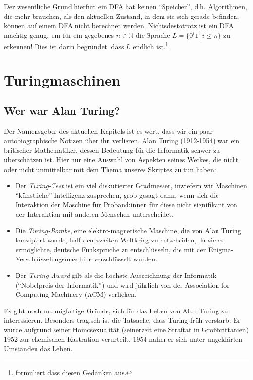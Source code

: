 Der wesentliche Grund hierfür: ein DFA hat keinen ``Speicher'',
d.h. Algorithmen, die mehr brauchen, als den aktuellen Zustand,
in dem sie sich gerade befinden,
können auf einem DFA nicht berechnet werden.
Nichtsdestotrotz ist ein DFA mächtig genug,
um für ein gegebenes $n \in \mathbb{N}$ die Sprache
$L = \{0^i1^i| i \leq n\}$ zu erkennen!
Dies ist darin begründet,
dass $L$ endlich ist.\footnote{
    \cite{aul} formuliert dass diesen Gedanken aus.
}

\section{Turingmaschinen}
\subsection{Wer war Alan Turing?}
Der Namensgeber des aktuellen Kapitels ist es wert,
dass wir ein paar autobiographische Notizen über ihn verlieren.
Alan Turing (1912-1954) war ein britischer Mathematiker,
dessen Bedeutung für die Informatik schwer zu überschätzen ist.
Hier nur eine Auswahl von Aspekten seines Werkes,
die nicht oder nicht unmittelbar mit dem Thema unseres Skriptes zu tun haben:
\begin{itemize}
    \item Der \emph{Turing-Test} ist ein viel diskutierter Gradmesser,
        inwiefern wir Maschinen ``künstliche'' Intelligenz zusprechen,
        grob gesagt dann, wenn sich die Interaktion der Maschine für Proband:innen
        für diese nicht signifikant von der Interaktion mit anderen Menschen unterscheidet.
    \item Die \emph{Turing-Bombe}, eine elektro-magnetische Maschine,
        die von Alan Turing konzipiert wurde,
        half den zweiten Weltkrieg zu entscheiden,
        da sie es ermöglichte,
        deutsche Funksprüche zu entschlüsseln,
        die mit der Enigma-Verschlüsselungsmaschine verschlüsselt wurden.
    \item Der \emph{Turing-Award} gilt als die höchste Auszeichnung der Informatik
        (``Nobelpreis der Informatik'') und wird jährlich von der
        Association for Computing Machinery (ACM) verliehen.
\end{itemize}
Es gibt noch mannigfaltige Gründe,
sich für das Leben von Alan Turing zu interessieren.
Besonders tragisch ist die Tatsache,
dass Turing früh verstarb:
Er wurde aufgrund seiner Homosexualität (seinerzeit eine Straftat in Großbrittanien)
1952 zur chemischen Kastration verurteilt.
1954 nahm er sich unter ungeklärten Umständen das Leben.

